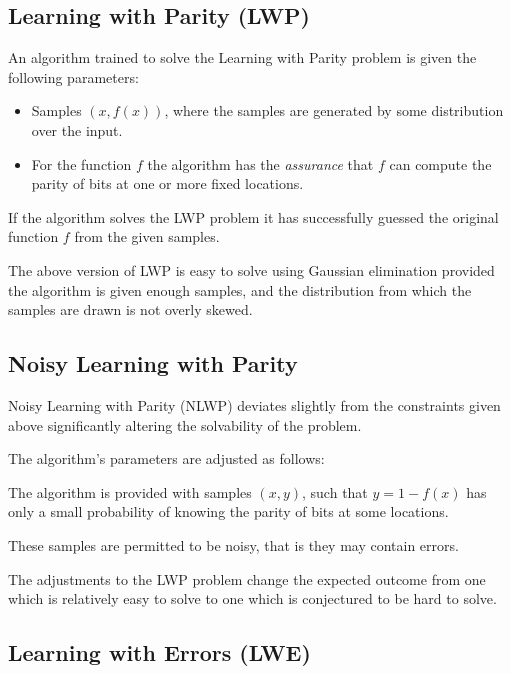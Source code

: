 \subsection{Learning with Parity (LWP)}


An algorithm trained to solve the Learning with Parity problem is given the following parameters:

\begin{itemize}
	\item Samples $(x, f(x))$, where the samples are generated by some distribution over the input.
	\item For the function $f$ the algorithm has the \emph{assurance} that $f$ can compute the parity of bits at one or more fixed locations.
\end{itemize}

If the algorithm solves the LWP problem it has successfully guessed the original function $f$ from the given samples.

The above version of LWP is easy to solve using Gaussian elimination provided the algorithm is given enough samples, and the distribution from which the samples are drawn is not overly skewed. 

\subsection{Noisy Learning with Parity}

Noisy Learning with Parity (NLWP) deviates slightly from the constraints given above significantly altering the solvability of the problem. 

The algorithm's parameters are adjusted as follows:


\begin{cond}
	The algorithm is provided with samples $(x,y)$, such that $y = 1- f(x)$ has only a small probability of knowing the parity of bits at some locations. 
\end{cond}

\begin{cond}
    These samples are permitted to be noisy, that is they may contain errors.
\end{cond}

The adjustments to the LWP problem change the expected outcome from one which is relatively easy to solve to one which is  conjectured to be hard to solve. 


\subsection{Learning with Errors (LWE)}

